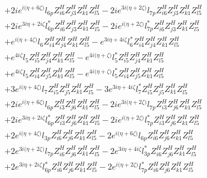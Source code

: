  \begin{align} 
 & +2 i e^{i \Big(\eta +6 \zeta \Big)} l_{6p} Z_{{i 6}}^{H} Z_{{j 3}}^{H} Z_{{k 1}}^{H} Z_{{l 5}}^{H} -2 i e^{3 i \Big(\eta +2 \zeta \Big)} l_{7p} Z_{{i 6}}^{H} Z_{{j 3}}^{H} Z_{{k 1}}^{H} Z_{{l 5}}^{H} \nonumber \\ 
 &+2 i e^{3 i \eta +2 i \zeta } l_{6p}^* Z_{{i 6}}^{H} Z_{{j 3}}^{H} Z_{{k 1}}^{H} Z_{{l 5}}^{H} -2 i e^{i \Big(\eta +2 \zeta \Big)} l_{7p}^* Z_{{i 6}}^{H} Z_{{j 3}}^{H} Z_{{k 1}}^{H} Z_{{l 5}}^{H} \nonumber \\ 
 &+e^{i \Big(\eta +4 \zeta \Big)} l_6 Z_{{i 4}}^{H} Z_{{j 4}}^{H} Z_{{k 1}}^{H} Z_{{l 5}}^{H} - e^{3 i \eta +4 i \zeta } l_6^* Z_{{i 4}}^{H} Z_{{j 4}}^{H} Z_{{k 1}}^{H} Z_{{l 5}}^{H} \nonumber \\ 
 &+e^{4 i \zeta } l_5 Z_{{i 5}}^{H} Z_{{j 4}}^{H} Z_{{k 1}}^{H} Z_{{l 5}}^{H} - e^{4 i \Big(\eta +\zeta \Big)} l_5^* Z_{{i 5}}^{H} Z_{{j 4}}^{H} Z_{{k 1}}^{H} Z_{{l 5}}^{H} \nonumber \\ 
 &+e^{4 i \zeta } l_5 Z_{{i 4}}^{H} Z_{{j 5}}^{H} Z_{{k 1}}^{H} Z_{{l 5}}^{H} - e^{4 i \Big(\eta +\zeta \Big)} l_5^* Z_{{i 4}}^{H} Z_{{j 5}}^{H} Z_{{k 1}}^{H} Z_{{l 5}}^{H} \nonumber \\ 
 &+3 e^{i \Big(\eta +4 \zeta \Big)} l_7 Z_{{i 5}}^{H} Z_{{j 5}}^{H} Z_{{k 1}}^{H} Z_{{l 5}}^{H} -3 e^{3 i \eta +4 i \zeta } l_7^* Z_{{i 5}}^{H} Z_{{j 5}}^{H} Z_{{k 1}}^{H} Z_{{l 5}}^{H} \nonumber \\ 
 &+2 i e^{i \Big(\eta +6 \zeta \Big)} l_{6p} Z_{{i 3}}^{H} Z_{{j 6}}^{H} Z_{{k 1}}^{H} Z_{{l 5}}^{H} -2 i e^{3 i \Big(\eta +2 \zeta \Big)} l_{7p} Z_{{i 3}}^{H} Z_{{j 6}}^{H} Z_{{k 1}}^{H} Z_{{l 5}}^{H} \nonumber \\ 
 &+2 i e^{3 i \eta +2 i \zeta } l_{6p}^* Z_{{i 3}}^{H} Z_{{j 6}}^{H} Z_{{k 1}}^{H} Z_{{l 5}}^{H} -2 i e^{i \Big(\eta +2 \zeta \Big)} l_{7p}^* Z_{{i 3}}^{H} Z_{{j 6}}^{H} Z_{{k 1}}^{H} Z_{{l 5}}^{H} \nonumber \\ 
 &+2 e^{i \Big(\eta +4 \zeta \Big)} l_{3p} Z_{{i 6}}^{H} Z_{{j 6}}^{H} Z_{{k 1}}^{H} Z_{{l 5}}^{H} -2 e^{i \Big(\eta +6 \zeta \Big)} l_{6p} Z_{{i 6}}^{H} Z_{{j 6}}^{H} Z_{{k 1}}^{H} Z_{{l 5}}^{H} \nonumber \\ 
 &+2 e^{3 i \Big(\eta +2 \zeta \Big)} l_{7p} Z_{{i 6}}^{H} Z_{{j 6}}^{H} Z_{{k 1}}^{H} Z_{{l 5}}^{H} -2 e^{3 i \eta +4 i \zeta } l_{3p}^* Z_{{i 6}}^{H} Z_{{j 6}}^{H} Z_{{k 1}}^{H} Z_{{l 5}}^{H} \nonumber \\ 
 &+2 e^{3 i \eta +2 i \zeta } l_{6p}^* Z_{{i 6}}^{H} Z_{{j 6}}^{H} Z_{{k 1}}^{H} Z_{{l 5}}^{H} -2 e^{i \Big(\eta +2 \zeta \Big)} l_{7p}^* Z_{{i 6}}^{H} Z_{{j 6}}^{H} Z_{{k 1}}^{H} Z_{{l 5}}^{H} \nonumber \\ 

\end{align}
